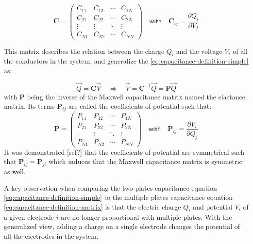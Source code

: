 \begin{equation} 
\label{eq:maxwell-capacitance-matrix}
\bm{C} = 
\begin{pmatrix}
C_{11} & C_{12} & \cdots & C_{1N} \\ 
C_{21} & C_{22} & \cdots & C_{2N} \\ 
\vdots & \vdots & \ddots & \vdots \\ 
C_{N1} & C_{N2} & \cdots & C_{NN}
\end{pmatrix}
\quad \textsf{with} \quad
\bm{C}_{ij} = \frac{\partial Q_i}{\partial V_j}
\end{equation}

This matrix describes the relation between the charge $Q_i$ and the voltage $V_i$ of all the conductors in the system, and generalize the \ref{eq:capacitance-definition-simple} as:

\begin{equation} 
\label{eq:capacitance-definition-matrix}
\vec{Q} =
\bm{C} \vec{V}
\quad \Leftrightarrow \quad
\vec{V} =
\bm{C}^{-1} \vec{Q} = \bm{P} \vec{Q}
\end{equation}
with $\bm{P}$ being the inverse of the Maxwell capacitance matrix named the elastance matrix. Its terms $\bm{P}_{ij}$ are called the coefficients of potential such that:
\begin{equation}
\label{eq:elastance-matrix}
\bm{P} =
\begin{pmatrix}
P_{11} & P_{12} & \cdots & P_{1N} \\ 
P_{21} & P_{22} & \cdots & P_{2N} \\ 
\vdots & \vdots & \ddots & \vdots \\ 
P_{N1} & P_{N2} & \cdots & P_{NN}
\end{pmatrix}
\quad \textsf{with} \quad
\bm{P}_{ij} = \frac{\partial V_i}{\partial Q_j}
\end{equation}
It was demonstrated [ref?] that the coefficients of potential are symmetrical such that  $\bm{P}_{ij} = \bm{P}_{ji}$ which induces that the Maxwell capacitance matrix is symmetric as well.

A key observation when comparing the two-plates capacitance equation \ref{eq:capacitance-definition-simple} to the multiple plates capacitance equation \ref{eq:capacitance-definition-matrix} is that the electric charge $Q_i$ and potential $V_i$ of a given electrode $i$ are no longer proportional with multiple plates. With the generalized view, adding a charge on a single electrode changes the potential of all the electrodes in the system.


